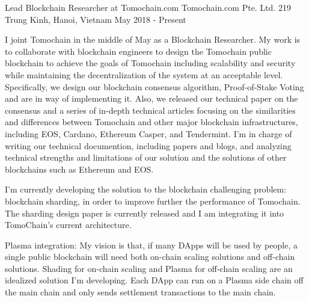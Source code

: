 
\begin{cventries}
	
	
\cventry
{Lead Blockchain Researcher at Tomochain.com} %
{Tomochain.com Pte. Ltd.} %
{219 Trung Kinh, Hanoi, Vietnam} %
{May 2018 - Present} %
{ %
	\begin{cvitems}
		\item {I joint Tomochain in the middle of May as a Blockchain Researcher. My work is to collaborate with blockchain engineers to design the Tomochain public blockchain to achieve the goals of Tomochain including scalability and security while maintaining the decentralization of the system at an acceptable level. Specifically, we design our blockchain consensus algorithm, Proof-of-Stake Voting and are in way of implementing it. Also, we released our technical paper on the consensus and a series of in-depth technical articles focusing on the similarities and differences between Tomochain and other major blockchain infrastructures, including EOS, Cardano, Ethereum Casper, and Tendermint. I'm in charge of writing our technical documention, including papers and blogs, and analyzing technical strengths and limitations of our solution and the solutions of other blockchains such as Ethereum and EOS.}
		\item {I'm currently developing the solution to the blockchain challenging problem: blockchain sharding, in order to improve further the performance of Tomochain. The sharding design paper is currently released and I am integrating it into TomoChain's current architecture.}	
		\item {Plasma integration: My vision is that, if many DApps will be used by people, a single public blockchain will need both on-chain scaling solutions and off-chain solutions. Shading for on-chain scaling and Plasma for off-chain scaling are an idealized solution I'm developing. Each DApp can run on a Plasma side chain off the main chain and only sends settlement transactions to the main chain. }	
	\end{cvitems}
}	


\end{cventries}
